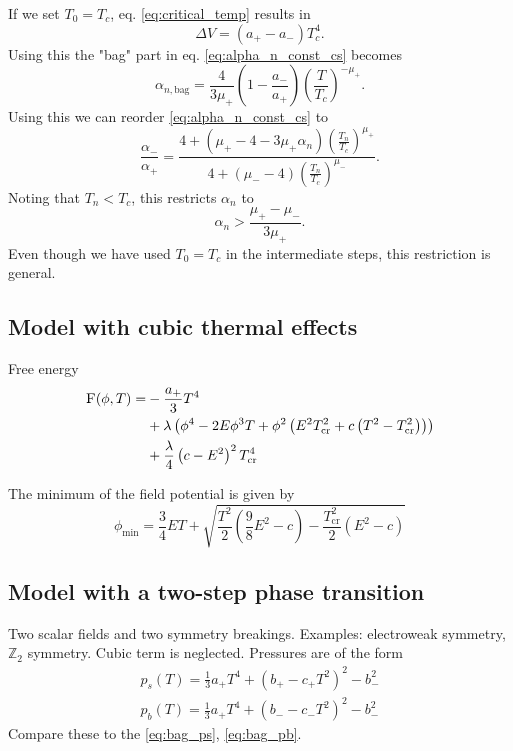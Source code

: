 If we set $T_0 = T_c$, eq. \eqref{eq:critical_temp} results in
\begin{equation}
\Delta V = (a_+ - a_-) T_c^4.
\end{equation}
Using this the "bag" part in eq. \ref{eq:alpha_n_const_cs} becomes
\begin{equation}
\alpha_{n,\text{bag}} = \frac{4}{3 \mu_+} \left( 1 - \frac{a_-}{a_+} \right) \left( \frac{T}{T_c} \right)^{-\mu_+}.
\end{equation}
Using this we can reorder \eqref{eq:alpha_n_const_cs} to
\begin{equation}
\frac{\alpha_-}{\alpha_+} = \frac{4 + \left( \mu_+ - 4 - 3 \mu_+ \alpha_n \right) \left(\frac{T_n}{T_c}\right)^{\mu_+}}{4 + \left( \mu_- - 4 \right) \left(\frac{T_n}{T_c}\right)^{\mu_-}}.
\end{equation}
Noting that $T_n < T_c$, this restricts $\alpha_n$ to
\begin{equation}
\alpha_n > \frac{\mu_+ - \mu_-}{3 \mu_+}.
\end{equation}
Even though we have used $T_0 = T_c$ in the intermediate steps, this restriction is general.


\subsection{Model with cubic thermal effects}
Free energy
\cite[eq. 45]{giese_2020}
\begin{align}
\begin{split}
\textsc{F}(\phi, T) =
&- \frac{a_+}{3} T^4 \\
&+ \lambda \left( \phi^4 - 2E\phi^3 T + \phi^2 \left( E^2 T_\text{cr}^2 + c \left( T^2 - T_\text{cr}^2 \right) \right) \right) \\
&+ \frac{\lambda}{4} \left( c - E^2 \right)^2 T_\text{cr}^4
\end{split}
\end{align}

The minimum of the field potential is given by
\cite[eq. 46]{giese_2020}
\begin{equation}
\phi_\text{min} = \frac{3}{4} ET + \sqrt{\frac{T^2}{2}(\frac{9}{8}E^2 - c) - \frac{T_\text{cr}^2}{2} (E^2 - c)}
\end{equation}


\subsection{Model with a two-step phase transition}
Two scalar fields and two symmetry breakings. Examples: electroweak symmetry, $\mathbb{Z}_2$ symmetry.
Cubic term is neglected.
Pressures are of the form
\cite[eq. 47-48]{giese_2020}
\begin{align}
p_s(T) = \frac{1}{3}a_+ T^4 + (b_+ - c_+ T^2)^2 - b_-^2 \\
p_b(T) = \frac{1}{3}a_+ T^4 + (b_- - c_-T^2)^2 - b_-^2
\end{align}
Compare these to the \eqref{eq:bag_ps}, \eqref{eq:bag_pb}.


